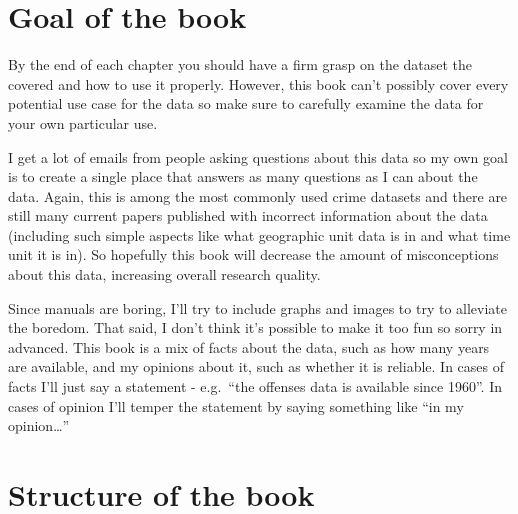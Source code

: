 \documentclass[
  12pt,
]{book}
\begin{document}
\hypertarget{goal-of-the-book}{%
\section*{Goal of the book}\label{goal-of-the-book}}

By the end of each chapter you should have a firm grasp on the dataset the covered and how to use it properly. However, this book can't possibly cover every potential use case for the data so make sure to carefully examine the data for your own particular use.

I get a lot of emails from people asking questions about this data so my own goal is to create a single place that answers as many questions as I can about the data. Again, this is among the most commonly used crime datasets and there are still many current papers published with incorrect information about the data (including such simple aspects like what geographic unit data is in and what time unit it is in). So hopefully this book will decrease the amount of misconceptions about this data, increasing overall research quality.

Since manuals are boring, I'll try to include graphs and images to try to alleviate the boredom. That said, I don't think it's possible to make it too fun so sorry in advanced. This book is a mix of facts about the data, such as how many years are available, and my opinions about it, such as whether it is reliable. In cases of facts I'll just say a statement - e.g.~``the offenses data is available since 1960''. In cases of opinion I'll temper the statement by saying something like ``in my opinion\ldots{}''

\hypertarget{structure-of-the-book}{%
\section*{Structure of the book}\label{structure-of-the-book}}
\end{document}

